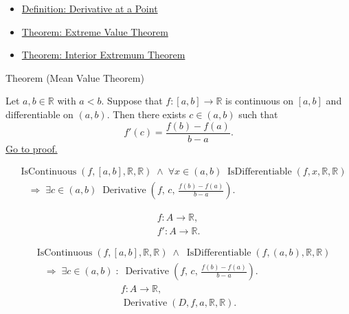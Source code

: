 \begin{dependencies}
\begin{itemize}
  \item \hyperref[def:derivative-at-a-point]{Definition: Derivative at a Point}
  \item \hyperref[thm:extreme-value-theorem]{Theorem: Extreme Value Theorem}
  \item \hyperref[thm:interior-extremum-theorem]{Theorem: Interior Extremum Theorem}
\end{itemize}
\end{dependencies}




\begin{theorembox}{Theorem (Mean Value Theorem)}
\begin{theorem}
\label{thm:mean-value-theorem}
Let $a, b \in \mathbb{R}$ with $a < b$. Suppose that $f : [a,b] \to \mathbb{R}$ is continuous on $[a,b]$ and differentiable on $(a,b)$. Then there exists $c \in (a,b)$ such that
\[
f'(c) = \frac{f(b) - f(a)}{b - a}.
\]
\hyperref[prf:mean-value-theorem]{Go to proof.}
\end{theorem}
\end{theorembox}

\begin{remark*}
\begin{align*}
&\operatorname{IsContinuous}(f,[a,b],\mathbb{R},\mathbb{R})
\;\land\;
\forall x \in (a,b)\;\operatorname{IsDifferentiable}(f,x,\mathbb{R},\mathbb{R})\\
&\quad\Rightarrow\;
\exists c \in (a,b)\;
\operatorname{Derivative}\!\left(f,\,c,\,\tfrac{f(b)-f(a)}{b-a}\right).
\end{align*}
\end{remark*}

\begin{remark*}
\[
\begin{aligned}
  f\colon A\to\mathbb{R},\\
  f'\colon A\to\mathbb{R}.
\end{aligned}
\]

\begin{align*}
&\operatorname{IsContinuous}(f,[a,b],\mathbb{R},\mathbb{R})
\;\land\;
\operatorname{IsDifferentiable}(f,(a,b),\mathbb{R},\mathbb{R})\\
&\quad\Longrightarrow\;
\exists c\in(a,b)\;:\;
\operatorname{Derivative}\!\left(f,\,c,\,\tfrac{f(b)-f(a)}{b-a}\right).
\end{align*}
\[
\begin{aligned}
  f\colon A\to\mathbb{R},\\
  \operatorname{Derivative}(D,f,a,\mathbb{R},\mathbb{R}).
\end{aligned}
\]
\end{remark*}

